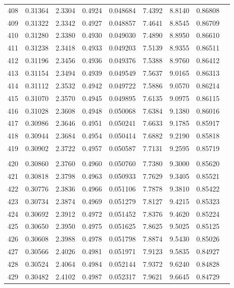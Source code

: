 \documentclass[letter,twosides,10pt]{article}
\begin{document}
\begin{longtable}{|c|c|c|c|c|c|c|c|c|}
408 & 0.31364 & 2.3304 & 0.4924 & 0.048684 & 7.4392 &  8.8140 & 0.86808 \\
409 & 0.31322 & 2.3342 & 0.4927 & 0.048857 & 7.4641 &  8.8545 & 0.86709 \\
410 & 0.31280 & 2.3380 & 0.4930 & 0.049030 & 7.4890 &  8.8950 & 0.86610 \\
411 & 0.31238 & 2.3418 & 0.4933 & 0.049203 & 7.5139 &  8.9355 & 0.86511 \\
412 & 0.31196 & 2.3456 & 0.4936 & 0.049376 & 7.5388 &  8.9760 & 0.86412 \\
413 & 0.31154 & 2.3494 & 0.4939 & 0.049549 & 7.5637 &  9.0165 & 0.86313 \\
414 & 0.31112 & 2.3532 & 0.4942 & 0.049722 & 7.5886 &  9.0570 & 0.86214 \\
415 & 0.31070 & 2.3570 & 0.4945 & 0.049895 & 7.6135 &  9.0975 & 0.86115 \\
416 & 0.31028 & 2.3608 & 0.4948 & 0.050068 & 7.6384 &  9.1380 & 0.86016 \\
417 & 0.30986 & 2.3646 & 0.4951 & 0.050241 & 7.6633 &  9.1785 & 0.85917 \\
418 & 0.30944 & 2.3684 & 0.4954 & 0.050414 & 7.6882 &  9.2190 & 0.85818 \\
419 & 0.30902 & 2.3722 & 0.4957 & 0.050587 & 7.7131 &  9.2595 & 0.85719 \\
 & & & & & & & \\
420 & 0.30860 & 2.3760 & 0.4960 & 0.050760 & 7.7380 &  9.3000 & 0.85620 \\
421 & 0.30818 & 2.3798 & 0.4963 & 0.050933 & 7.7629 &  9.3405 & 0.85521 \\
422 & 0.30776 & 2.3836 & 0.4966 & 0.051106 & 7.7878 &  9.3810 & 0.85422 \\
423 & 0.30734 & 2.3874 & 0.4969 & 0.051279 & 7.8127 &  9.4215 & 0.85323 \\
424 & 0.30692 & 2.3912 & 0.4972 & 0.051452 & 7.8376 &  9.4620 & 0.85224 \\
425 & 0.30650 & 2.3950 & 0.4975 & 0.051625 & 7.8625 &  9.5025 & 0.85125 \\
426 & 0.30608 & 2.3988 & 0.4978 & 0.051798 & 7.8874 &  9.5430 & 0.85026 \\
427 & 0.30566 & 2.4026 & 0.4981 & 0.051971 & 7.9123 &  9.5835 & 0.84927 \\
428 & 0.30524 & 2.4064 & 0.4984 & 0.052144 & 7.9372 &  9.6240 & 0.84828 \\
429 & 0.30482 & 2.4102 & 0.4987 & 0.052317 & 7.9621 &  9.6645 & 0.84729 \\

\end{longtable}
\end{document}
